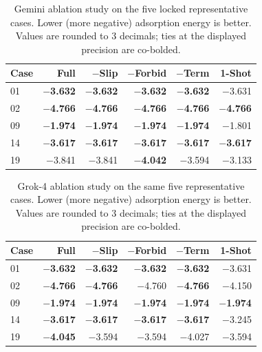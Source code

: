 
\begin{table}[t]
\centering
\caption{Gemini ablation study on the five locked representative cases. Lower (more negative) adsorption energy is better. Values are rounded to 3 decimals; ties at the displayed precision are co-bolded.}
\label{tab:ablation-gemini}
\begin{tabular}{lrrrrr}
\toprule
Case & Full & $-$Slip & $-$Forbid & $-$Term & 1-Shot \\
\midrule
01 & \textbf{$-$3.632} & \textbf{$-$3.632} & \textbf{$-$3.632} & \textbf{$-$3.632} & $-$3.631 \\
02 & \textbf{$-$4.766} & \textbf{$-$4.766} & \textbf{$-$4.766} & \textbf{$-$4.766} & \textbf{$-$4.766} \\
09 & \textbf{$-$1.974} & \textbf{$-$1.974} & \textbf{$-$1.974} & \textbf{$-$1.974} & $-$1.801 \\
14 & \textbf{$-$3.617} & \textbf{$-$3.617} & \textbf{$-$3.617} & \textbf{$-$3.617} & \textbf{$-$3.617} \\
19 & $-$3.841 & $-$3.841 & \textbf{$-$4.042} & $-$3.594 & $-$3.133 \\
\bottomrule
\end{tabular}
\end{table}

\begin{table}[t]
\centering
\caption{Grok-4 ablation study on the same five representative cases. Lower (more negative) adsorption energy is better. Values are rounded to 3 decimals; ties at the displayed precision are co-bolded.}
\label{tab:ablation-grok}
\begin{tabular}{lrrrrr}
\toprule
Case & Full & $-$Slip & $-$Forbid & $-$Term & 1-Shot \\
\midrule
01 & \textbf{$-$3.632} & \textbf{$-$3.632} & \textbf{$-$3.632} & \textbf{$-$3.632} & $-$3.631 \\
02 & \textbf{$-$4.766} & \textbf{$-$4.766} & $-$4.760 & \textbf{$-$4.766} & $-$4.150 \\
09 & \textbf{$-$1.974} & \textbf{$-$1.974} & \textbf{$-$1.974} & \textbf{$-$1.974} & \textbf{$-$1.974} \\
14 & \textbf{$-$3.617} & \textbf{$-$3.617} & \textbf{$-$3.617} & \textbf{$-$3.617} & $-$3.245 \\
19 & \textbf{$-$4.045} & $-$3.594 & $-$3.594 & $-$4.027 & $-$3.594 \\
\bottomrule
\end{tabular}
\end{table}


